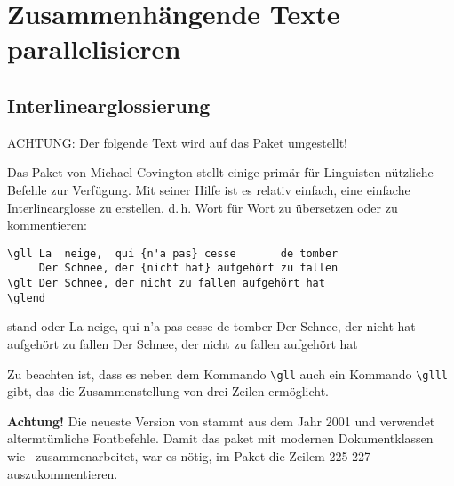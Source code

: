 \chapter{Zusammenhängende Texte parallelisieren}

\section{Interlinearglossierung}


ACHTUNG: Der folgende Text wird auf das Paket  umgestellt!

Das Paket  von Michael Covington stellt einige primär für Linguisten nützliche
Befehle zur Verfügung. Mit seiner Hilfe ist es relativ einfach, eine einfache 
Interlinearglosse zu erstellen, d.\,h. Wort für Wort zu übersetzen oder zu kommentieren:

\begin{lstlisting}
\gll La  neige,  qui {n'a pas} cesse       de tomber 
     Der Schnee, der {nicht hat} aufgehört zu fallen 
\glt Der Schnee, der nicht zu fallen aufgehört hat
\glend 
\end{lstlisting}
stand oder
\gll La  neige,  qui {n'a pas} cesse       de tomber 
     Der Schnee, der {nicht hat} aufgehört zu fallen 
\glt Der Schnee, der nicht zu fallen aufgehört hat
\glend

Zu beachten ist, dass es neben dem Kommando \lstinline/\gll/ auch ein Kommando 
\lstinline/\glll/ gibt, das die Zusammenstellung von drei Zeilen ermöglicht.

\textbf{Achtung!} Die neueste Version von  stammt aus dem Jahr 
2001 und verwendet altermtümliche Fontbefehle. Damit das paket mit modernen Dokumentklassen 
wie \KOMAScript\ zusammenarbeitet, war es nötig, im Paket die Zeilem 225-227 auszukommentieren.
